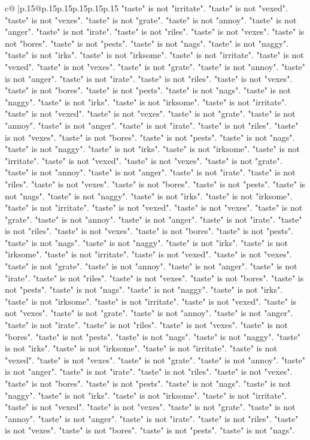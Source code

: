 \documentclass{article}
\begin{document}
{\begin{supertabular}{c@{$\;$}|p{.15\linewidth}@{}p{.15\linewidth}p{.15\linewidth}p{.15\linewidth}p{.15\linewidth}p{.15\linewidth}}
{{{"taste" is not "irritate". "taste" is not "vexed". "taste" is not "vexes". "taste" is not "grate". "taste" is not "annoy". "taste" is not "anger". "taste" is not "irate". "taste" is not "riles". "taste" is not "vexes". "taste" is not "bores". "taste" is not "pests". "taste" is not "nags". "taste" is not "naggy". "taste" is not "irks". "taste" is not "irksome". "taste" is not "irritate". "taste" is not "vexed". "taste" is not "vexes". "taste" is not "grate". "taste" is not "annoy". "taste" is not "anger". "taste" is not "irate". "taste" is not "riles". "taste" is not "vexes". "taste" is not "bores". "taste" is not "pests". "taste" is not "nags". "taste" is not "naggy". "taste" is not "irks". "taste" is not "irksome". "taste" is not "irritate". "taste" is not "vexed". "taste" is not "vexes". "taste" is not "grate". "taste" is not "annoy". "taste" is not "anger". "taste" is not "irate". "taste" is not "riles". "taste" is not "vexes". "taste" is not "bores". "taste" is not "pests". "taste" is not "nags". "taste" is not "naggy". "taste" is not "irks". "taste" is not "irksome". "taste" is not "irritate". "taste" is not "vexed". "taste" is not "vexes". "taste" is not "grate". "taste" is not "annoy". "taste" is not "anger". "taste" is not "irate". "taste" is not "riles". "taste" is not "vexes". "taste" is not "bores". "taste" is not "pests". "taste" is not "nags". "taste" is not "naggy". "taste" is not "irks". "taste" is not "irksome". "taste" is not "irritate". "taste" is not "vexed". "taste" is not "vexes". "taste" is not "grate". "taste" is not "annoy". "taste" is not "anger". "taste" is not "irate". "taste" is not "riles". "taste" is not "vexes". "taste" is not "bores". "taste" is not "pests". "taste" is not "nags". "taste" is not "naggy". "taste" is not "irks". "taste" is not "irksome". "taste" is not "irritate". "taste" is not "vexed". "taste" is not "vexes". "taste" is not "grate". "taste" is not "annoy". "taste" is not "anger". "taste" is not "irate". "taste" is not "riles". "taste" is not "vexes". "taste" is not "bores". "taste" is not "pests". "taste" is not "nags". "taste" is not "naggy". "taste" is not "irks". "taste" is not "irksome". "taste" is not "irritate". "taste" is not "vexed". "taste" is not "vexes". "taste" is not "grate". "taste" is not "annoy". "taste" is not "anger". "taste" is not "irate". "taste" is not "riles". "taste" is not "vexes". "taste" is not "bores". "taste" is not "pests". "taste" is not "nags". "taste" is not "naggy". "taste" is not "irks". "taste" is not "irksome". "taste" is not "irritate". "taste" is not "vexed". "taste" is not "vexes". "taste" is not "grate". "taste" is not "annoy". "taste" is not "anger". "taste" is not "irate". "taste" is not "riles". "taste" is not "vexes". "taste" is not "bores". "taste" is not "pests". "taste" is not "nags". "taste" is not "naggy". "taste" is not "irks". "taste" is not "irksome". "taste" is not "irritate". "taste" is not "vexed". "taste" is not "vexes". "taste" is not "grate". "taste" is not "annoy". "taste" is not "anger". "taste" is not "irate". "taste" is not "riles". "taste" is not "vexes". "taste" is not "bores". "taste" is not "pests". "taste" is not "nags". }}}
\end{supertabular}}
\end{document}
